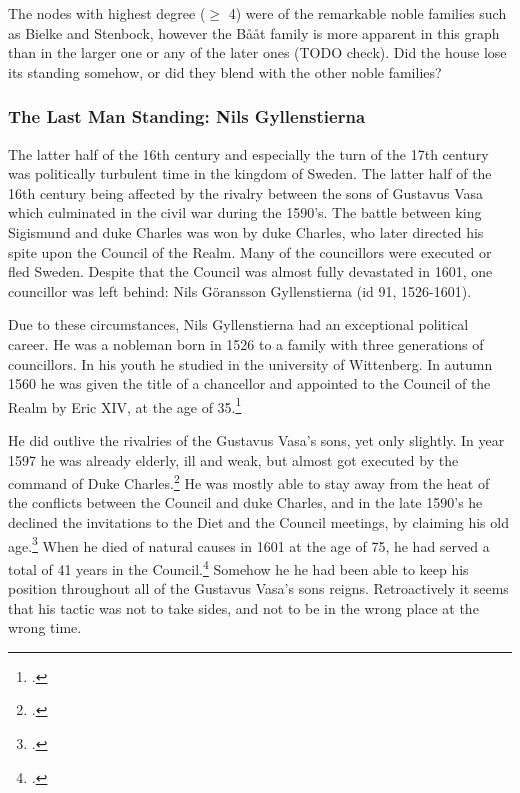 The nodes with highest degree ($\geq$ 4) were of the remarkable noble families such as Bielke and Stenbock, however the Bååt family is more apparent in this graph than in the larger one or any of the later ones (TODO check). Did the house lose its standing somehow, or did they blend with the other noble families?

\subsubsection{The Last Man Standing: Nils Gyllenstierna}
The latter half of the 16th century and especially the turn of the 17th century was politically turbulent time in the kingdom of Sweden. The latter half of the 16th century being affected by the rivalry between the sons of Gustavus Vasa which culminated in the civil war during the 1590's. The battle between king Sigismund and duke Charles was won by duke Charles, who later directed his spite upon the Council of the Realm. Many of the councillors were executed or fled Sweden. Despite that the Council was almost fully devastated in 1601, one councillor was left behind: Nils Göransson Gyllenstierna (id 91, 1526-1601).

Due to these circumstances, Nils Gyllenstierna had an exceptional political career. He was a nobleman born in 1526 to a family with three generations of councillors. In his youth he studied in the university of Wittenberg. In autumn 1560 he was given the title of a chancellor and appointed to the Council of the Realm by Eric XIV, at the age of 35.\footcite{sbl_nils_gyllenstierna} 

He did outlive the rivalries of the Gustavus Vasa's sons, yet only slightly. In year 1597 he was already elderly, ill and weak, but almost got executed by the command of Duke Charles.\footcite[pp. 205-206.]{lappalainen09} He was mostly able to stay away from the heat of the conflicts between the Council and duke Charles, and in the late 1590's he declined the invitations to the Diet and the Council meetings, by claiming his old age.\footcite{sbl_nils_gyllenstierna} When he died of natural causes in 1601 at the age of 75, he had served a total of 41 years in the Council.\footcite{councillorsDS} Somehow he he had been able to keep his position throughout all of the Gustavus Vasa's sons reigns. Retroactively it seems that his tactic was not to take sides, and not to be in the wrong place at the wrong time.

